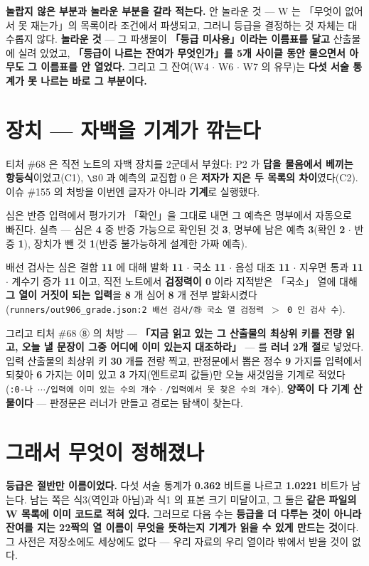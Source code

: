 \documentclass{article}
\begin{document}
\textbf{놀랍지 않은 부분과 놀라운 부분을 갈라 적는다.}
안 놀라운 것 --- W 는 「무엇이 없어서 못 재는가」의 목록이라 조건에서 파생되고,
그러니 등급을 결정하는 것 자체는 대수롭지 않다.
\textbf{놀라운 것} --- 그 파생물이 \textbf{「등급 미사용」이라는 이름표를 달고} 산출물에 실려 있었고,
\textbf{「등급이 나르는 잔여가 무엇인가」를 5개 사이클 동안 물으면서 아무도 그 이름표를 안 열었다.}
그리고 그 잔여(W4 $\cdot$ W6 $\cdot$ W7 의 유무)는
\textbf{다섯 서술 통계가 못 나르는 바로 그 부분이다.}

\section{장치 --- 자백을 기계가 깎는다}

티처 \#68 은 직전 노트의 자백 장치를 2군데서 부쉈다:
P2 가 \textbf{답을 물음에서 베끼는 항등식}이었고(C1),
$\S$0 과 예측의 교집합 0 은 \textbf{저자가 지은 두 목록의 차이}였다(C2).
이슈 \#155 의 처방을 이번엔 글자가 아니라 \textbf{기계}로 실행했다.

{심은 반증 입력에서 평가기가 「확인」을 그대로 내면 그 예측은 명부에서 자동으로 빠진다.
실측 --- 심은 \textbf{4} 중 반증 가능으로 확인된 것 \textbf{3},
명부에 남은 예측 \textbf{3}(확인 \textbf{2} $\cdot$ 반증 \textbf{1}),
장치가 뺀 것 \textbf{1}(반증 불가능하게 설계한 가짜 예측).}

배선 검사는 심은 결함 \textbf{11} 에 대해 발화 \textbf{11} $\cdot$ 국소 \textbf{11} $\cdot$
음성 대조 \textbf{11} $\cdot$ 지우면 통과 \textbf{11} $\cdot$ 계수기 증가 \textbf{11} 이고,
직전 노트에서 \textbf{검정력이 0} 이라 지적받은 「국소」 열에 대해
\textbf{그 열이 거짓이 되는 입력}을 \textbf{8} 개 심어 \textbf{8} 개 전부 발화시켰다
(\texttt{runners/out906\_grade.json:2 배선 검사/㉱ 국소 열 검정력 $>$ 0 인 검사 수}).

그리고 티처 \#68 ⑧ 의 처방 --- \textbf{「지금 읽고 있는 그 산출물의 최상위 키를 전량 읽고,
오늘 낼 문장이 그중 어디에 이미 있는지 대조하라」} --- 를 \textbf{러너 2개 절}로 넣었다.
입력 산출물의 최상위 키 \textbf{30} 개를 전량 찍고,
판정문에서 뽑은 정수 \textbf{9} 가지를 입력에서 되찾아
\textbf{6} 가지는 이미 있고 \textbf{3} 가지(엔트로피 값들)만 오늘 새것임을 기계로 적었다
(\texttt{:0-나 $\cdots$/입력에 이미 있는 수의 개수} $\cdot$ \texttt{/입력에서 못 찾은 수의 개수}).
\textbf{양쪽이 다 기계 산물이다} --- 판정문은 러너가 만들고 경로는 탐색이 찾는다.

\section{그래서 무엇이 정해졌나}

\textbf{등급은 절반만 이름이었다.} 다섯 서술 통계가 \textbf{0.362} 비트를 나르고
\textbf{1.0221} 비트가 남는다. 남는 쪽은 식3(역인과 아님)과 식1 의 표본 크기 미달이고,
그 둘은 \textbf{같은 파일의 W 목록에 이미 코드로 적혀 있다.}
그러므로 다음 수는 \textbf{등급을 더 다투는 것이 아니라}
\textbf{잔여를 지는 22짝의 열 이름이 무엇을 뜻하는지 기계가 읽을 수 있게 만드는 것}이다.
그 사전은 저장소에도 세상에도 없다 --- 우리 자료의 우리 열이라 밖에서 받을 것이 없다.
\end{document}
